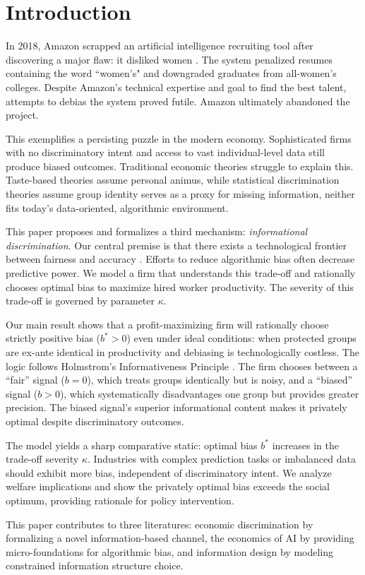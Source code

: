 \section{Introduction}

In 2018, Amazon scrapped an artificial intelligence recruiting tool after discovering a major flaw: it disliked women \citep{Dastin2018}. The system penalized resumes containing the word ``women's" and downgraded graduates from all-women's colleges. Despite Amazon's technical expertise and goal to find the best talent, attempts to debias the system proved futile. Amazon ultimately abandoned the project.

This exemplifies a persisting puzzle in the modern economy. Sophisticated firms with no discriminatory intent and access to vast individual-level data still produce biased outcomes. Traditional economic theories struggle to explain this. Taste-based theories \citep{Becker1957} assume personal animus, while statistical discrimination theories \citep{Phelps1972, Arrow1973} assume group identity serves as a proxy for missing information, neither fits today's data-oriented, algorithmic environment.

This paper proposes and formalizes a third mechanism: \textit{informational discrimination}. Our central premise is that there exists a technological frontier between fairness and accuracy \citep{Kleinberg2017, Chouldechova2017}. Efforts to reduce algorithmic bias often decrease predictive power. We model a firm that understands this trade-off and rationally chooses optimal bias to maximize hired worker productivity. The severity of this trade-off is governed by parameter $\kappa$.

Our main result shows that a profit-maximizing firm will rationally choose strictly positive bias ($b^* > 0$) even under ideal conditions: when protected groups are ex-ante identical in productivity and debiasing is technologically costless. The logic follows Holmstrom's Informativeness Principle \citep{Holmstrom1979}. The firm chooses between a ``fair'' signal ($b=0$), which treats groups identically but is noisy, and a ``biased'' signal ($b>0$), which systematically disadvantages one group but provides greater precision. The biased signal's superior informational content makes it privately optimal despite discriminatory outcomes.

The model yields a sharp comparative static: optimal bias $b^*$ increases in the trade-off severity $\kappa$. Industries with complex prediction tasks or imbalanced data should exhibit more bias, independent of discriminatory intent. We analyze welfare implications and show the privately optimal bias exceeds the social optimum, providing rationale for policy intervention.

This paper contributes to three literatures: economic discrimination by formalizing a novel information-based channel, the economics of AI by providing micro-foundations for algorithmic bias, and information design \citep{Kamenica2011, Bergemann2019} by modeling constrained information structure choice.